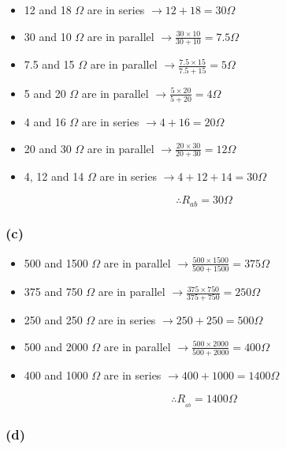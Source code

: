 \documentclass[11pt]{article}
\begin{document}
\begin{itemize}
\item 12 and 18 \(\Omega\) are in series \(\to 12 + 18 = 30 \Omega\)

\item 30 and 10 \(\Omega\) are in parallel \(\to \frac{30 \times 10}{30 + 10} = 7.5 \Omega\)

\item 7.5 and 15 \(\Omega\) are in parallel \(\to \frac{7.5 \times 15}{7.5 + 15} = 5 \Omega\)

\item 5 and 20 \(\Omega\) are in parallel \(\to \frac{5 \times 20}{5 + 20} = 4 \Omega\)

\item 4 and 16 \(\Omega\) are in series \(\to 4 + 16 = 20 \Omega\)

\item 20 and 30 \(\Omega\) are in parallel \(\to \frac{20 \times 30}{20 + 30} = 12 \Omega\)

\item 4, 12 and 14 \(\Omega\) are in series \(\to 4 + 12 + 14 = 30 \Omega\)
\end{itemize}

$$\therefore \boxed{R_{ab} = 30 \Omega}$$
\subsubsection{(c)}
\label{sec:orgc871c4c}

\begin{itemize}
\item 500 and 1500 \(\Omega\) are in parallel \(\to \frac{500 \times 1500}{500 + 1500} = 375 \Omega\)

\item 375 and 750 \(\Omega\) are in parallel \(\to \frac{375 \times 750}{375 + 750} = 250 \Omega\)

\item 250 and 250 \(\Omega\) are in series \(\to 250 + 250 = 500 \Omega\)

\item 500 and 2000 \(\Omega\) are in parallel \(\to \frac{500 \times 2000}{500 + 2000} = 400 \Omega\)

\item 400 and 1000 \(\Omega\) are in series \(\to 400 + 1000 = 1400 \Omega\)
\end{itemize}

$$\therefore \boxed{R_{_{ab}} = 1400 \Omega}$$
\subsubsection{(d)}
\label{sec:orge49f39e}
\end{document}
